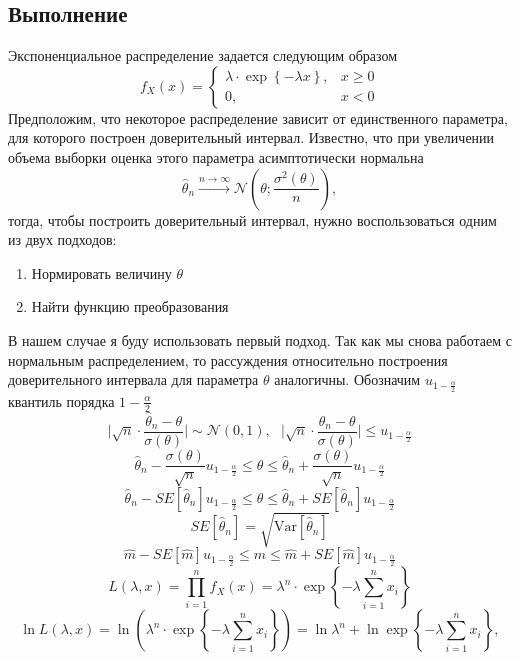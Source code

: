 \documentclass[a4paper, 12pt]{article}
\begin{document}
    \subsection{Выполнение}
    Экспоненциальное распределение задается следующим образом
    $$f_X(x)=
    \begin{cases}
        \lambda\cdot\exp{\left\{-\lambda x\right\}},& x\geq0\\
        0,& x < 0
    \end{cases}$$
    Предположим, что некоторое распределение зависит от единственного параметра, для которого построен доверительный интервал.
    Известно, что при увеличении объема выборки оценка этого параметра асимптотически нормальна
    $$\hat{\theta}_n\xrightarrow{n\to\infty}\mathcal{N}\left(\theta;\dfrac{\sigma^2\left(\theta\right)}{n}\right),$$
    тогда, чтобы построить доверительный интервал, нужно воспользоваться одним из двух подходов:
    \begin{enumerate}
        \item Нормировать величину $\theta$
        \item Найти функцию преобразования
    \end{enumerate}
    В нашем случае я буду использовать первый подход. Так как мы снова работаем с нормальным распределением, то рассуждения относительно
    построения доверительного интервала для параметра $\theta$ аналогичны. Обозначим $u_{1-\frac{\alpha}{2}}$ квантиль порядка $1-\frac{\alpha}{2}$
    $$\Bigg|\sqrt{n}\cdot\dfrac{\hat{\theta}_n-\theta}{\sigma\left(\theta\right)}\Bigg|\sim\mathcal{N}\left(0,1\right),\,\,\,\, \Bigg|\sqrt{n}\cdot\dfrac{\hat{\theta}_n-\theta}{\sigma\left(\theta\right)}\Bigg|\leq u_{1-\frac{\alpha}{2}}$$
    $$\hat{\theta}_n-\dfrac{\sigma\left(\theta\right)}{\sqrt{n}}u_{1-\frac{\alpha}{2}}\leq\theta\leq\hat{\theta}_n+\dfrac{\sigma\left(\theta\right)}{\sqrt{n}}u_{1-\frac{\alpha}{2}}$$
    $$\hat{\theta}_n-SE\left[\hat{\theta}_n\right]u_{1-\frac{\alpha}{2}}\leq\theta\leq\hat{\theta}_n+SE\left[\hat{\theta}_n\right]u_{1-\frac{\alpha}{2}}$$
    $$SE\left[\hat{\theta}_n\right]=\sqrt{\text{Var}\left[\hat{\theta}_n\right]}$$
    $$\hat{m}-SE\left[\hat{m}\right]u_{1-\frac{\alpha}{2}}\leq m\leq\hat{m}+SE\left[\hat{m}\right]u_{1-\frac{\alpha}{2}}$$
    $$L\left(\lambda,x\right)=\prod_{i=1}^{n}f_X\left(x\right)=\lambda^n\cdot\exp{\left\{-\lambda\sum\limits_{i=1}^{n}x_i\right\}}$$
    $$\ln{L\left(\lambda,x\right)}=\ln{\left(\lambda^n\cdot\exp{\left\{-\lambda\sum\limits_{i=1}^{n}x_i\right\}}\right)}=
    \ln{\lambda^n}+\ln{\exp{\left\{-\lambda\sum\limits_{i=1}^{n}x_i\right\}}},$$
\end{document}
